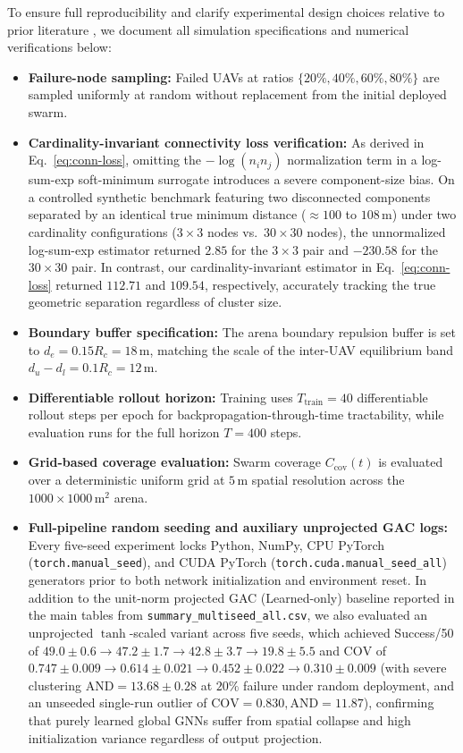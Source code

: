 \documentclass[11pt]{article}
\theoremstyle{plain}
\theoremstyle{definition}
\theoremstyle{remark}
\begin{document}
To ensure full reproducibility and clarify experimental design choices relative to prior literature \citep{peng2026r2c}, we document all simulation specifications and numerical verifications below:
\begin{itemize}[nosep]
  \item \textbf{Failure-node sampling:} Failed UAVs at ratios $\{20\%, 40\%, 60\%, 80\%\}$ are sampled uniformly at random without replacement from the initial deployed swarm.
  \item \textbf{Cardinality-invariant connectivity loss verification:} As derived in Eq.~\eqref{eq:conn-loss}, omitting the $-\log(n_i n_j)$ normalization term in a log-sum-exp soft-minimum surrogate introduces a severe component-size bias. On a controlled synthetic benchmark featuring two disconnected components separated by an identical true minimum distance ($\approx 100$ to $108\,\mathrm{m}$) under two cardinality configurations ($3\times3$ nodes vs.\ $30\times30$ nodes), the unnormalized log-sum-exp estimator returned $2.85$ for the $3\times3$ pair and $-230.58$ for the $30\times30$ pair. In contrast, our cardinality-invariant estimator in Eq.~\eqref{eq:conn-loss} returned $112.71$ and $109.54$, respectively, accurately tracking the true geometric separation regardless of cluster size.
  \item \textbf{Boundary buffer specification:} The arena boundary repulsion buffer is set to $d_e = 0.15 R_c = 18\,\mathrm{m}$, matching the scale of the inter-UAV equilibrium band $d_u - d_l = 0.1 R_c = 12\,\mathrm{m}$.
  \item \textbf{Differentiable rollout horizon:} Training uses $T_{\mathrm{train}} = 40$ differentiable rollout steps per epoch for backpropagation-through-time tractability, while evaluation runs for the full horizon $T = 400$ steps.
  \item \textbf{Grid-based coverage evaluation:} Swarm coverage $C_{\mathrm{cov}}(t)$ is evaluated over a deterministic uniform grid at $5\,\mathrm{m}$ spatial resolution across the $1000 \times 1000\,\mathrm{m}^2$ arena.
  \item \textbf{Full-pipeline random seeding and auxiliary unprojected GAC logs:} Every five-seed experiment locks Python, NumPy, CPU PyTorch (\texttt{torch.manual\_seed}), and CUDA PyTorch (\texttt{torch.cuda.manual\_seed\_all}) generators prior to both network initialization and environment reset. In addition to the unit-norm projected GAC (Learned-only) baseline reported in the main tables from \texttt{summary\_multiseed\_all.csv}, we also evaluated an unprojected $\tanh$-scaled variant across five seeds, which achieved Success/50 of $49.0\pm0.6 \to 47.2\pm1.7 \to 42.8\pm3.7 \to 19.8\pm5.5$ and $\mathrm{COV}$ of $0.747\pm0.009 \to 0.614\pm0.021 \to 0.452\pm0.022 \to 0.310\pm0.009$ (with severe clustering $\mathrm{AND} = 13.68\pm0.28$ at $20\%$ failure under random deployment, and an unseeded single-run outlier of $\mathrm{COV}=0.830, \mathrm{AND}=11.87$), confirming that purely learned global GNNs suffer from spatial collapse and high initialization variance regardless of output projection.
\end{itemize}
\end{document}
